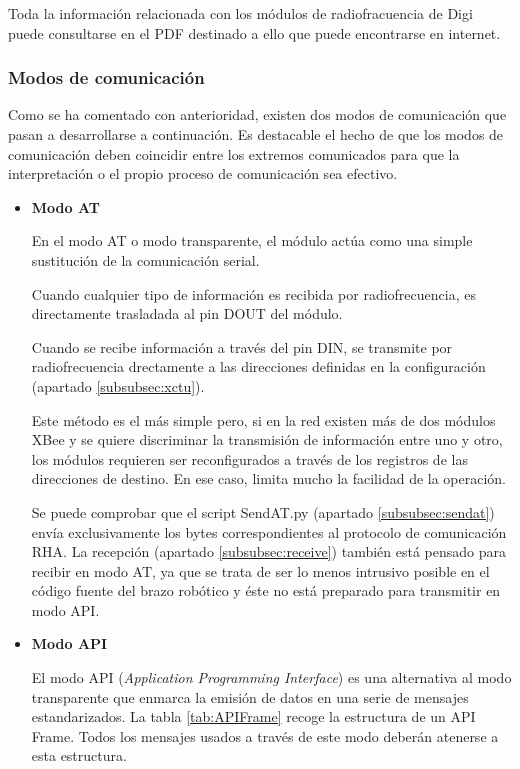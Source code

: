 Toda la información relacionada con los módulos de radiofracuencia de Digi puede consultarse en el PDF destinado a ello\cite{Digi:2018} que puede encontrarse en internet.

\subsubsection{Modos de comunicación}\label{subsubsec:modoscom}

Como se ha comentado con anterioridad, existen dos modos de comunicación que pasan a desarrollarse a continuación. Es destacable el hecho de que los modos de comunicación deben coincidir entre los extremos comunicados para que la interpretación o el propio proceso de comunicación sea efectivo.

\begin{itemize}
\item \textbf{Modo AT}

En el modo AT o modo transparente, el módulo actúa como una simple sustitución de la comunicación serial.

Cuando cualquier tipo de información es recibida por radiofrecuencia, es directamente trasladada al pin DOUT del módulo.

Cuando se recibe información a través del pin DIN, se transmite por radiofrecuencia drectamente a las direcciones definidas en la configuración (apartado \ref{subsubsec:xctu}).

Este método es el más simple pero, si en la red existen más de dos módulos XBee y se quiere discriminar la transmisión de información entre uno y otro, los módulos requieren ser reconfigurados a través de los registros de las direcciones de destino. En ese caso, limita mucho la facilidad de la operación.

Se puede comprobar que el script SendAT.py (apartado \ref{subsubsec:sendat}) envía exclusivamente los bytes correspondientes al protocolo de comunicación RHA. La recepción (apartado \ref{subsubsec:receive}) también está pensado para recibir en modo AT, ya que se trata de ser lo menos intrusivo posible en el código fuente del brazo robótico y éste no está preparado para transmitir en modo API.

\item \textbf{Modo API}

El modo API (\textit{Application Programming Interface}) es una alternativa al modo transparente que enmarca la emisión de datos en una serie de mensajes estandarizados. La tabla \ref{tab:APIFrame} recoge la estructura de un API Frame. Todos los mensajes usados a través de este modo deberán atenerse a esta estructura.


\end{itemize}
